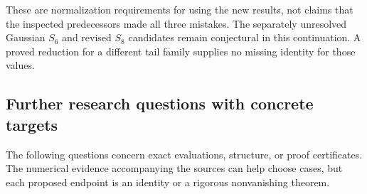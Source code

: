 These are normalization requirements for using the new results, not
claims that the inspected predecessors made all three mistakes.
The separately unresolved Gaussian $S_6$ and revised $S_8$ candidates
remain conjectural in this continuation. A proved reduction for a
different tail family supplies no missing identity for those values.

\subsection{Further research questions with concrete targets}
\label{sec:questions}

The following questions concern exact evaluations, structure, or proof
certificates. The numerical evidence accompanying the sources can help
choose cases, but each proposed endpoint is an identity or a rigorous
nonvanishing theorem.

